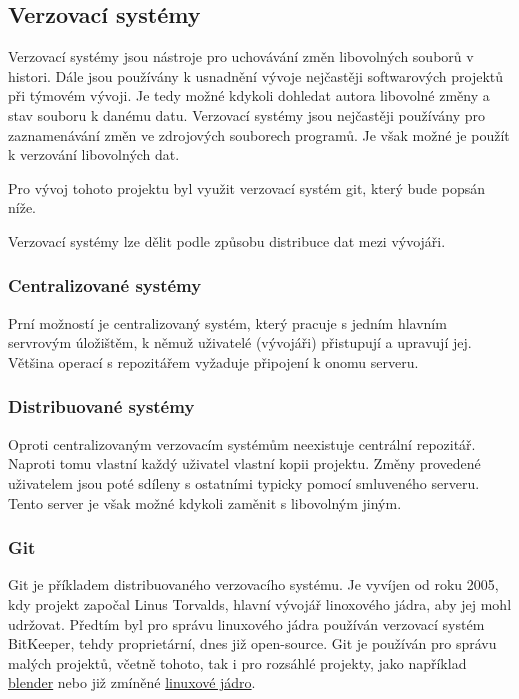 \documentclass[main.tex]{subfiles}
\begin{document}
\subsection{Verzovací systémy}
\label{git}
Verzovací systémy jsou nástroje pro uchovávání změn libovolných souborů v histori. Dále jsou používány k usnadnění vývoje nejčastěji softwarových projektů při týmovém vývoji. Je tedy možné kdykoli dohledat autora libovolné změny a stav souboru k danému datu. Verzovací systémy jsou nejčastěji používány pro zaznamenávání změn ve zdrojových souborech programů. Je však možné je použít k verzování libovolných dat.

Pro vývoj tohoto projektu byl využit verzovací systém git, který bude popsán níže.

Verzovací systémy lze dělit podle způsobu distribuce dat mezi vývojáři.

\subsubsection{Centralizované systémy}
Prní možností je centralizovaný systém, který pracuje s jedním hlavním servrovým úložištěm, k němuž uživatelé (vývojáři) přistupují a upravují jej. Většina operací s repozitářem vyžaduje připojení k onomu serveru.

\subsubsection{Distribuované systémy}
Oproti centralizovaným verzovacím systémům neexistuje centrální repozitář. Naproti tomu vlastní každý uživatel vlastní kopii projektu. Změny provedené uživatelem jsou poté sdíleny s ostatními typicky pomocí smluveného serveru. Tento server je však možné kdykoli zaměnit s libovolným jiným.

\subsubsection{Git}
Git je příkladem distribuovaného verzovacího systému. Je vyvíjen od roku 2005, kdy projekt započal Linus Torvalds, hlavní vývojář linoxového jádra, aby jej mohl udržovat. Předtím byl pro správu linuxového jádra používán verzovací systém BitKeeper, tehdy proprietární, dnes již open-source. \cite{web:wik:en:git} Git je používán pro správu malých projektů, včetně tohoto, tak i pro rozsáhlé projekty, jako například \href{https://github.com/blender/blender}{blender} nebo již zmíněné \href{https://github.com/torvalds/linux}{linuxové jádro}.
\end{document}
